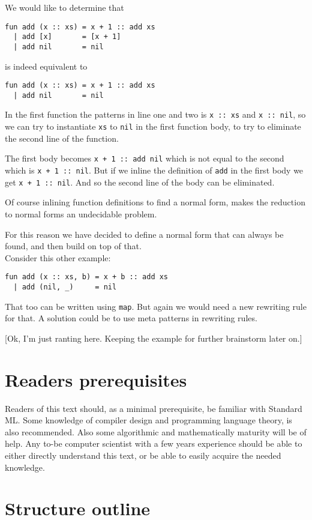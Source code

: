 We would like to determine that
\begin{lstlisting}
fun add (x :: xs) = x + 1 :: add xs
  | add [x]       = [x + 1]
  | add nil       = nil
\end{lstlisting}
is indeed equivalent to
\begin{lstlisting}
fun add (x :: xs) = x + 1 :: add xs
  | add nil       = nil
\end{lstlisting}
In the first function the patterns in line one and two is \texttt{x :: xs} and
\texttt{x :: nil}, so we can try to instantiate \texttt{xs} to \texttt{nil} in
the first function body, to try to eliminate the second line of the function.

The first body becomes \texttt{x + 1 :: add nil} which is not equal to the
second which is \texttt{x + 1 :: nil}. But if we inline the definition of
\texttt{add} in the first body we get \texttt{x + 1 :: nil}. And so the second
line of the body can be eliminated.

Of course inlining function definitions to find a normal form, makes the
reduction to normal forms an undecidable problem.

For this reason we have decided to define a normal form that can always be
found, and then build on top of that.\\[1em]

Consider this other example:
\begin{lstlisting}
fun add (x :: xs, b) = x + b :: add xs
  | add (nil, _)     = nil
\end{lstlisting}
That too can be written using \texttt{map}. But again we would need a new
rewriting rule for that. A solution could be to use meta patterns in rewriting
rules.

[Ok, I'm just ranting here. Keeping the example for further brainstorm later on.]

\section{Readers prerequisites}


Readers of this text should, as a minimal prerequisite, be familiar with
Standard ML. Some knowledge of compiler design and programming language theory,
is also recommended. Also some algorithmic and mathematically maturity will be
of help. Any to-be computer scientist with a few years experience should be able
to either directly understand this text, or be able to easily acquire the needed
knowledge.

\section{Structure outline}


